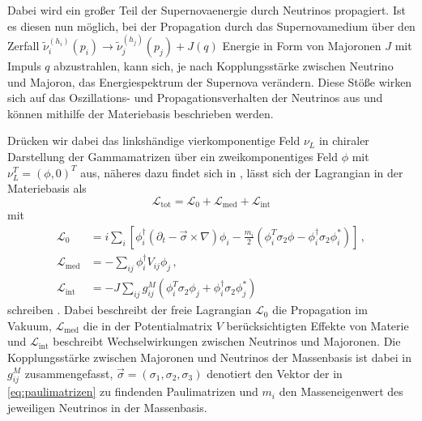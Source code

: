 Dabei wird ein großer Teil der Supernovaenergie durch Neutrinos propagiert.
Ist es diesen nun möglich, bei der Propagation durch das Supernovamedium über den Zerfall $\tilde{\nu}^{(h_i)}_i (p_i) \rightarrow \tilde{\nu}^{(h_j)}_j (p_j) + J(q)$
Energie in Form von Majoronen $J$ mit Impuls $q$ abzustrahlen, kann sich, je nach Kopplungsstärke zwischen Neutrino und Majoron, das Energiespektrum der Supernova verändern.
Diese Stöße wirken sich auf das Oszillations- und Propagationsverhalten der Neutrinos aus und können mithilfe der Materiebasis beschrieben werden.

Drücken wir dabei das linkshändige vierkomponentige Feld $\nu_L$ in chiraler Darstellung der Gammamatrizen über ein zweikomponentiges Feld $\phi$ mit $\nu^T_L = (\phi, 0)^T$ aus, 
näheres dazu findet sich in \cite{komponentendinger}, lässt sich der Lagrangian in der Materiebasis als
\begin{equation}
    \mathcal{L}_\text{tot} = \mathcal{L}_0 + \mathcal{L}_\text{med} + \mathcal{L}_\text{int}
    \label{eq:materielagrange}
\end{equation}
mit
\begin{align*}
    \mathcal{L}_0          &=   i \sum_i \left[\phi^\dagger_i \left(\partial_t - \vec{\sigma} \times \nabla \right) \phi_i - \frac{m_i}{2} \left(\phi^T_i \sigma_2 \phi - \phi^\dagger_i \sigma_2 \phi^*_i\right) \right] \,,\\
    \mathcal{L}_\text{med} &= - \sum_{i j} \phi^\dagger_i V_{i j} \phi_j  \,,\\
    \mathcal{L}_\text{int} &= - J \sum_{i j} g^M_{i j} \left( \phi^T_i \sigma_2 \phi_j + \phi^\dagger_i \sigma_2 \phi^*_j \right)
\end{align*}
schreiben \cite{päspaper}.
Dabei beschreibt der freie Lagrangian $\mathcal{L}_0$ die Propagation im Vakuum, $\mathcal{L}_\text{med}$ die in der Potentialmatrix $V$ berücksichtigten Effekte von Materie und $\mathcal{L}_\text{int}$
beschreibt Wechselwirkungen zwischen Neutrinos und Majoronen.
Die Kopplungsstärke zwischen Majoronen und Neutrinos der Massenbasis ist dabei in $g^M_{i j}$ zusammengefasst, $\vec{\sigma} = (\sigma_1, \sigma_2, \sigma_3)$ denotiert den Vektor der in \eqref{eq:paulimatrizen} zu findenden Paulimatrizen
und $m_i$ den Masseneigenwert des jeweiligen Neutrinos in der Massenbasis.

